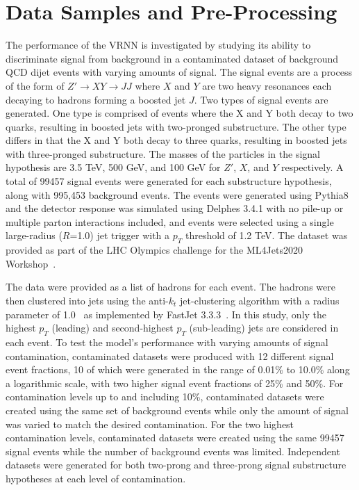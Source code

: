 \documentclass[11pt, a4paper]{article}
\begin{document}

\section{Data Samples and Pre-Processing}


The performance of the VRNN is investigated by studying its ability to discriminate signal from background in a contaminated dataset of background QCD dijet events with varying amounts of signal. The signal events are a process of the form of $Z'\rightarrow XY \rightarrow JJ$ where $X$ and $Y$ are two heavy resonances each decaying to hadrons forming a boosted jet $J$. Two types of signal events are generated. One type is comprised of events where the X and Y both decay to two quarks, resulting in boosted jets with two-pronged substructure. The other type differs in that the X and Y both decay to three quarks, resulting in boosted jets with three-pronged substructure. The masses of the particles in the signal hypothesis are 3.5 TeV, 500 GeV, and 100 GeV for $Z'$, $X$, and $Y$ respectively. A total of 99457 signal events were generated for each substructure hypothesis, along with 995,453 background events. The events were generated using {\sc Pythia8} and the detector response was simulated using {\sc Delphes 3.4.1} with no pile-up or multiple parton interactions included, and events were selected using a single large-radius ($R$=1.0) jet trigger with a $p_T$ threshold of 1.2 TeV. The dataset was provided as part of the LHC Olympics challenge for the ML4Jets2020 Workshop~\cite{dataset}. 

The data were provided as a list of hadrons for each event. The hadrons were then clustered into jets using the anti-$k_{t}$ jet-clustering algorithm with a radius parameter of 1.0~\cite{Cacciari_2008} as implemented by  {\sc FastJet 3.3.3}~\cite{fastjet}. In this study, only the highest $p_{T}$ (leading) and second-highest $p_{T}$ (sub-leading) jets are considered in each event. To test the model's performance with varying amounts of signal contamination, contaminated datasets were produced with 12 different signal event fractions, 10 of which were generated in the range of 0.01\% to 10.0\% along a logarithmic scale, with two higher signal event fractions of 25\% and 50\%. For contamination levels up to and including 10\%, contaminated datasets were created using the same set of background events while only the amount of signal was varied to match the desired contamination. For the two highest contamination levels, contaminated datasets were created using the same 99457 signal events while the number of background events was limited. 
Independent datasets were generated for both two-prong and three-prong signal substructure hypotheses at each level of contamination.
\end{document}
